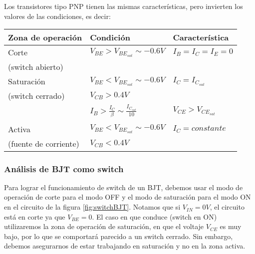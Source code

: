 \documentclass[11pt,fancy,lang=es]{elegantbook}
\begin{document}
\newpage
Los transistores tipo PNP tienen las mismas características, pero invierten los valores de las condiciones, es decir:

\begin{table}[!h]
    \centering
    \begin{tabular}{|l|l|l|}
        Zona de operación     & Condición                                           & Característica        \\\hline
        Corte                 & $V_{BE}>V_{BE_{sat}}\sim-0.6V$                      & $I_B=I_C=I_E=0$       \\
        (switch abierto)      &                                                     &                       \\\hline
        Saturación            & $V_{BE}<V_{BE_{sat}}\sim-0.6V$                      & $I_C= I_{C_{sat}}$    \\
        (switch cerrado)      & $V_{CB}>0.4V$                                       &                       \\
                              & $I_B>\frac{I_C}{\beta} \sim \frac{I_{C_{sat}}}{10}$ & $V_{CE}>V_{CE_{sat}}$ \\
                              &                                                     &                       \\ \hline
        Activa                & $V_{BE}<V_{BE_{sat}}\sim-0.6V$                      & $I_C= constante$      \\
        (fuente de corriente) & $V_{CB}<0.4V$                                       &                       \\
    \end{tabular}
\end{table}


\subsubsection{Análisis de BJT como switch}
Para lograr el funcionamiento de switch de un BJT, debemos usar el modo de operación de corte para el modo OFF y el modo de saturación para el modo ON en el circuito de la figura  \ref{fig:switchBJT}. Notamos que si $V_{IN}=0V$, el circuito está en corte ya que $V_{BE}=0$. El caso en que conduce (switch en ON) utilizaremos la zona de operación de saturación, en que el voltaje $V_{CE}$ es muy bajo, por lo que se comportará parecido a un switch cerrado. Sin embargo, debemos asegurarnos de estar trabajando en saturación y no en la zona activa.
\end{document}
